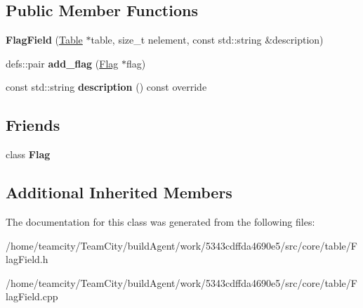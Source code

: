 \subsection*{Public Member Functions}
\begin{DoxyCompactItemize}
\item 
{\bfseries Flag\+Field} (\hyperlink{classTable}{Table} $\ast$table, size\+\_\+t nelement, const std\+::string \&description)\hypertarget{classFlagField_af1cf5752d23bee71cad1e8f9e5c0d90c}{}\label{classFlagField_af1cf5752d23bee71cad1e8f9e5c0d90c}

\item 
defs\+::pair {\bfseries add\+\_\+flag} (\hyperlink{classFlag}{Flag} $\ast$flag)\hypertarget{classFlagField_a288b67beb33841ecdb06f3af772682d1}{}\label{classFlagField_a288b67beb33841ecdb06f3af772682d1}

\item 
const std\+::string {\bfseries description} () const override\hypertarget{classFlagField_adba81577f60c7b80923394a5437234fa}{}\label{classFlagField_adba81577f60c7b80923394a5437234fa}

\end{DoxyCompactItemize}
\subsection*{Friends}
\begin{DoxyCompactItemize}
\item 
class {\bfseries Flag}\hypertarget{classFlagField_a3c61b282d6d35a5f37ea21d544b6a633}{}\label{classFlagField_a3c61b282d6d35a5f37ea21d544b6a633}

\end{DoxyCompactItemize}
\subsection*{Additional Inherited Members}


The documentation for this class was generated from the following files\+:\begin{DoxyCompactItemize}
\item 
/home/teamcity/\+Team\+City/build\+Agent/work/5343cdffda4690e5/src/core/table/Flag\+Field.\+h\item 
/home/teamcity/\+Team\+City/build\+Agent/work/5343cdffda4690e5/src/core/table/Flag\+Field.\+cpp\end{DoxyCompactItemize}
